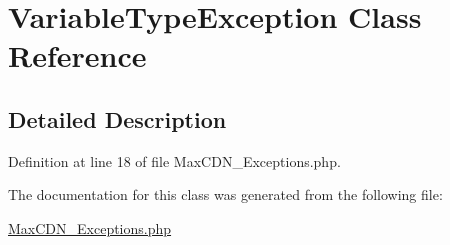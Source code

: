 \hypertarget{class_variable_type_exception}{
\section{VariableTypeException Class Reference}
\label{class_variable_type_exception}
}


\subsection{Detailed Description}


Definition at line 18 of file MaxCDN\_\-Exceptions.php.



The documentation for this class was generated from the following file:\begin{DoxyCompactItemize}
\item 
\hyperlink{_max_c_d_n___exceptions_8php}{MaxCDN\_\-Exceptions.php}\end{DoxyCompactItemize}
